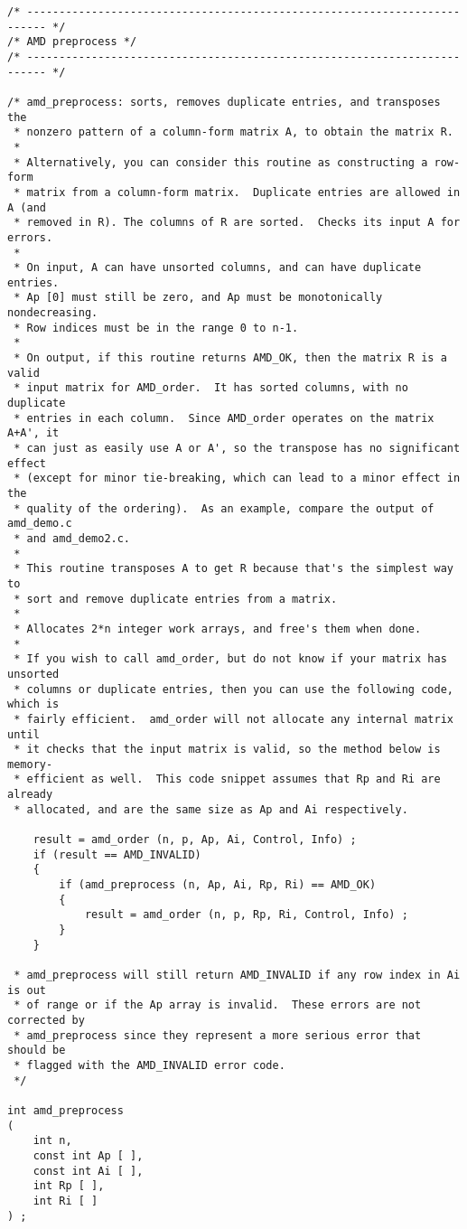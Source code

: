 \documentclass[11pt]{article}
\begin{document}
{\begin{verbatim}
/* ------------------------------------------------------------------------- */
/* AMD preprocess */
/* ------------------------------------------------------------------------- */

/* amd_preprocess: sorts, removes duplicate entries, and transposes the
 * nonzero pattern of a column-form matrix A, to obtain the matrix R.
 *
 * Alternatively, you can consider this routine as constructing a row-form
 * matrix from a column-form matrix.  Duplicate entries are allowed in A (and
 * removed in R). The columns of R are sorted.  Checks its input A for errors.
 *
 * On input, A can have unsorted columns, and can have duplicate entries.
 * Ap [0] must still be zero, and Ap must be monotonically nondecreasing.
 * Row indices must be in the range 0 to n-1.
 *
 * On output, if this routine returns AMD_OK, then the matrix R is a valid
 * input matrix for AMD_order.  It has sorted columns, with no duplicate
 * entries in each column.  Since AMD_order operates on the matrix A+A', it
 * can just as easily use A or A', so the transpose has no significant effect
 * (except for minor tie-breaking, which can lead to a minor effect in the
 * quality of the ordering).  As an example, compare the output of amd_demo.c
 * and amd_demo2.c.
 *
 * This routine transposes A to get R because that's the simplest way to
 * sort and remove duplicate entries from a matrix.
 *
 * Allocates 2*n integer work arrays, and free's them when done.
 *
 * If you wish to call amd_order, but do not know if your matrix has unsorted
 * columns or duplicate entries, then you can use the following code, which is
 * fairly efficient.  amd_order will not allocate any internal matrix until
 * it checks that the input matrix is valid, so the method below is memory-
 * efficient as well.  This code snippet assumes that Rp and Ri are already
 * allocated, and are the same size as Ap and Ai respectively.

    result = amd_order (n, p, Ap, Ai, Control, Info) ;
    if (result == AMD_INVALID)
    {
        if (amd_preprocess (n, Ap, Ai, Rp, Ri) == AMD_OK)
        {
            result = amd_order (n, p, Rp, Ri, Control, Info) ;
        }
    }

 * amd_preprocess will still return AMD_INVALID if any row index in Ai is out
 * of range or if the Ap array is invalid.  These errors are not corrected by
 * amd_preprocess since they represent a more serious error that should be
 * flagged with the AMD_INVALID error code.
 */ 

int amd_preprocess
(
    int n,
    const int Ap [ ],
    const int Ai [ ],
    int Rp [ ],
    int Ri [ ]
) ;


\end{verbatim}}
\end{document}
